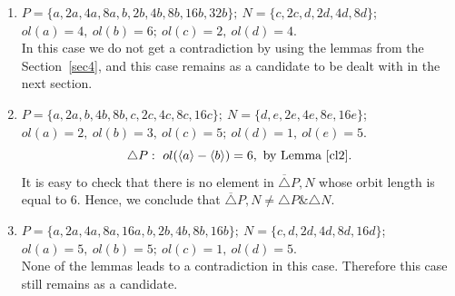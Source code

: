{{{\begin{enumerate}
	 $$\triangle N : \ 
	  ol(\langle c \rangle - \langle c \rangle)=ol(\langle c \rangle - \langle d \rangle )=ol(\langle d \rangle - \langle d \rangle)=3,  \mbox{ by Corollary \ref{cl11}}$$
	 and the number of these elements is $3\times2+2\times3\times3+3\times2=30$;
 
	 $$ \overline{\triangle} P,N :  \ 
	  ol(\langle a \rangle - \langle c \rangle)=ol(\langle a \rangle - \langle d \rangle)=3, \mbox{ by Observation \ref{cl0}}$$   
	 and the number of these elements is $2\times1\times3+2\times1\times3=12$;
	 $$ ol(\langle b \rangle - \langle c \rangle) = ol(\langle b \rangle - \langle d \rangle)=9, \mbox{ by Lemma \ref{cl4}} .$$
	 Thus the number of elements in $ \overline{\triangle} P,N $ whose orbit length is equal to 3 
	 is smaller then the number of such elements in $ \triangle P  \& \triangle N $.
	 Hence, we obtain that $ \overline{\triangle} P,N  \neq \triangle P  \& \triangle N  $.

  \item  $ P=\{a,2a,4a,8a,b,2b,4b,8b,16b,32b\}; \  N=\{c,2c,d,2d,4d,8d\} $; \\  
	 $ ol(a)=4, \ ol(b)=6; \  ol(c)=2, \  ol(d)=4 $.\\
	 In this case we do not get a contradiction by using the lemmas from the 
	 Section~\ref{sec4}, and this case remains as a candidate to be dealt with in the 
	 next section.


  \item  $ P=\{a,2a,b,4b,8b,c,2c,4c,8c,16c\}; \  N=\{d,e,2e,4e,8e,16e\} $; \\  
	 $ ol(a)=2, \ ol(b)=3, \  ol(c)=5; \  ol(d)=1, \  ol(e)=5 $.\\
	 $$\triangle P : \ 
	  ol(\langle a \rangle - \langle b \rangle)=6, \mbox{ by Lemma \ref{cl2}}. $$
	 It is easy to check that 
	 there is no element in $ \overline{\triangle} P,N $ whose orbit length is equal to 6.
	 Hence, we conclude that $ \overline{\triangle} P,N  \neq \triangle P \& \triangle N $.
  
  \item  $ P=\{a,2a,4a,8a,16a,b,2b,4b,8b,16b\}; \  N=\{c,d,2d,4d,8d,16d\} $; \\ 
	 $ ol(a)=5, \ ol(b)=5; \  ol(c)=1, \  ol(d)=5 $.\\
	 None of the lemmas leads to a contradiction in this case.
	 Therefore this case still remains as a candidate. 



\end{enumerate}}}}
